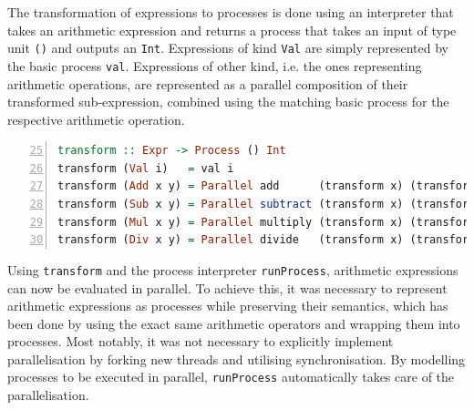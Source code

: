 The transformation of expressions to processes is done using an interpreter \cite{Gamma:1995:DPE:186897} that takes an arithmetic expression and returns a process that takes an input of type unit \texttt{()} and outputs an \texttt{Int}. Expressions of kind \texttt{Val} are simply represented by the basic process \texttt{val}. Expressions of other kind, i.e. the ones representing arithmetic operations, are represented as a parallel composition of their transformed sub-expression, combined using the matching basic process for the respective arithmetic operation.
\begin{lstlisting}[language=Haskell, caption=Transformation from arithmetic expressions to processes., label=lst:arith_transformation, numbers=left, frame=bt, firstnumber=25, basicstyle=\footnotesize\ttfamily]
transform :: Expr -> Process () Int
transform (Val i)   = val i
transform (Add x y) = Parallel add      (transform x) (transform y)
transform (Sub x y) = Parallel subtract (transform x) (transform y)
transform (Mul x y) = Parallel multiply (transform x) (transform y)
transform (Div x y) = Parallel divide   (transform x) (transform y)
\end{lstlisting}

Using \texttt{transform} and the process interpreter \texttt{runProcess}, arithmetic expressions can now be evaluated in parallel. To achieve this, it was necessary to represent arithmetic expressions as processes while preserving their semantics, which has been done by using the exact same arithmetic operators and wrapping them into processes. Most notably, it was not necessary to explicitly implement parallelisation by forking new threads and utilising synchronisation. By modelling processes to be executed in parallel, \texttt{runProcess} automatically takes care of the parallelisation.